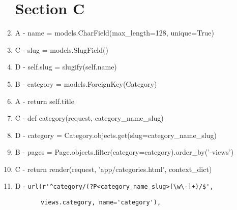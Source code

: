 \documentclass{article}
\begin{document}
\begin{enumerate}
\section{Section C}
\item A - name = models.CharField(max\_length=128, unique=True)
\item C - slug = models.SlugField()
\item D - self.slug = slugify(self.name)
\item B - category = models.ForeignKey(Category)
\item A - return self.title
\item C - def category(request, category\_name\_slug)
\item D - category = Category.objects.get(slug=category\_name\_slug)
\item B - pages = Page.objects.filter(category=category).order\_by('-views')
\item C - return render(request, 'app/categories.html', context\_dict)
\item D - \verb|url(r'^category/(?P<category_name_slug>[\w\-]+)/$', |

\verb|		 views.category, name='category'),|
\end{enumerate}
\end{document}
